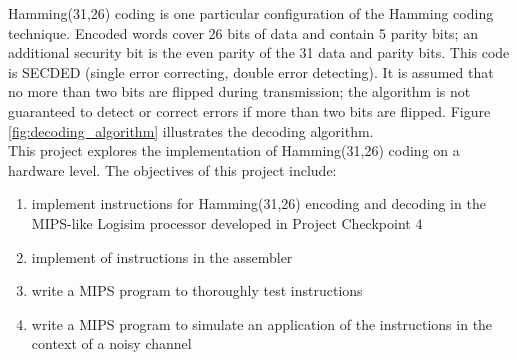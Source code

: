 \documentclass[letterpaper]{article} %
\begin{document}
\noindent
Hamming(31,26) coding is one particular configuration of the Hamming coding technique. Encoded words cover 26 bits of data and contain 5 parity bits; an additional security bit is the even parity of the 31 data and parity bits. This code is SECDED (single error correcting, double error detecting). It is assumed that no more than two bits are flipped during transmission; the algorithm is not guaranteed to detect or correct errors if more than two bits are flipped. Figure \ref{fig:decoding_algorithm} illustrates the decoding algorithm.\\

\noindent
This project explores the implementation of Hamming(31,26) coding on a hardware level. The objectives of this project include:
\begin{enumerate}
	\item implement instructions for Hamming(31,26) encoding and decoding in the MIPS-like Logisim processor developed in Project Checkpoint 4
	\item implement of instructions in the assembler
	\item write a MIPS program to thoroughly test instructions
	\item write a MIPS program to simulate an application of the instructions in the context of a noisy channel
\end{enumerate}
\end{document}
